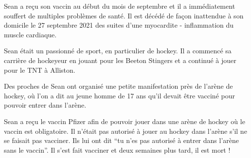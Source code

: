 Sean a reçu son vaccin au début du mois de septembre et il a immédiatement
souffert de multiples problèmes de santé. Il est décédé de façon inattendue à
son domicile le 27 septembre 2021 des suites d'une myocardite - inflammation du
muscle cardiaque.

Sean était un passionné de sport, en particulier de hockey. Il a commencé sa
carrière de hockeyeur en jouant pour les Beeton Stingers et a continué à jouer
pour le TNT à Alliston.

Des proches de Sean ont organisé une petite manifestation près de l'arène de
hockey, où l'on a dit au jeune homme de 17 ans qu'il devait être vacciné pour
pouvoir entrer dans l'arène.

Sean a reçu le vaccin Pfizer afin de pouvoir jouer dans une arène de hockey où
le vaccin est obligatoire. Il n'était pas autorisé à jouer au hockey dans
l'arène s'il ne se faisait pas vacciner. Ils lui ont dit “tu n'es pas autorisé à
entrer dans l'arène sans le vaccin”. Il s'est fait vacciner et deux semaines
plus tard, il est mort !

